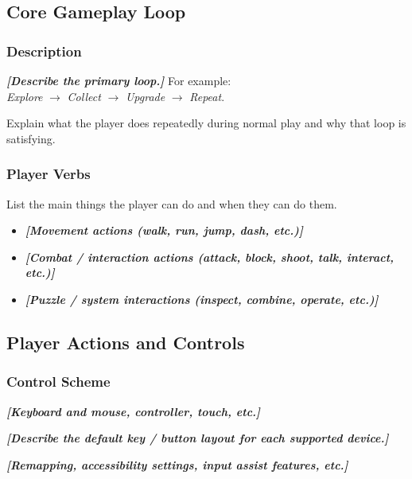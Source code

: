 \documentclass[12pt]{article}
\newcommand{\placeholder}[1]{\textbf{\textit{[#1]}}}
\begin{document}
\subsection{Core Gameplay Loop}

\subsubsection*{Description}

\placeholder{Describe the primary loop.} For example: \\
\textit{Explore} $\rightarrow$ \textit{Collect} $\rightarrow$ \textit{Upgrade} $\rightarrow$ \textit{Repeat}.

Explain what the player does repeatedly during normal play and why that loop is satisfying.

\subsubsection*{Player Verbs}

List the main things the player can do and when they can do them.

\begin{itemize}
    \item \placeholder{Movement actions (walk, run, jump, dash, etc.)}
    \item \placeholder{Combat / interaction actions (attack, block, shoot, talk, interact, etc.)}
    \item \placeholder{Puzzle / system interactions (inspect, combine, operate, etc.)}
\end{itemize}

\subsection{Player Actions and Controls}

\subsubsection*{Control Scheme}

\begin{description}[leftmargin=3.2cm, labelsep=0.8cm, style=nextline]
    \item[Input Devices]
        \placeholder{Keyboard and mouse, controller, touch, etc.}
    \item[Default Mapping]
        \placeholder{Describe the default key / button layout for each supported device.}
    \item[Accessibility]
        \placeholder{Remapping, accessibility settings, input assist features, etc.}
\end{description}
\end{document}
